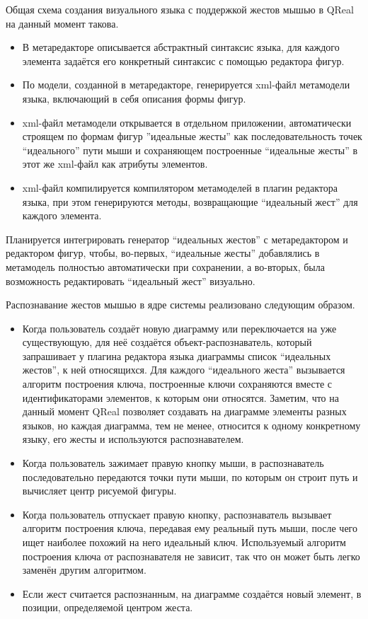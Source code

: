 \documentclass[a5paper]{article}
\begin{document}
Общая схема создания визуального языка с поддержкой жестов мышью в QReal на данный момент такова.
\begin{itemize}
  \item В метаредакторе описывается абстрактный синтаксис языка, для каждого элемента задаётся его конкретный синтаксис с помощью редактора фигур.
  \item По модели, созданной в метаредакторе, генерируется xml-файл метамодели языка, включающий в себя описания формы фигур.
  \item xml-файл метамодели открывается в отдельном приложении, автоматически строящем по формам фигур ''идеальные жесты'' как последовательность точек ``идеального'' пути мыши и сохраняющем построенные ``идеальные жесты'' в этот же xml-файл как атрибуты элементов.
  \item xml-файл компилируется компилятором метамоделей в плагин редактора языка, при этом генерируются методы, возвращающие ``идеальный жест'' для каждого элемента.
\end{itemize}
Планируется интегрировать генератор ``идеальных жестов'' с метаредактором и редактором фигур, чтобы, во-первых, ``идеальные жесты'' добавлялись в метамодель полностью автоматически при сохранении, а во-вторых, была возможность редактировать ``идеальный жест'' визуально.

Распознавание жестов мышью в ядре системы реализовано следующим образом.
\begin{itemize}
  \item Когда пользователь создаёт новую диаграмму или переключается на уже существующую, для неё создаётся объект-распознаватель, который запрашивает у плагина редактора языка диаграммы список ``идеальных жестов'', к ней относящихся. Для каждого ``идеального жеста'' вызывается алгоритм построения ключа, построенные ключи сохраняются вместе с идентификаторами элементов, к которым они относятся. Заметим, что на данный момент QReal позволяет создавать на диаграмме элементы разных языков, но каждая диаграмма, тем не менее, относится к одному конкретному языку, его жесты и используются распознавателем.
  \item Когда пользователь зажимает правую кнопку мыши, в распознаватель последовательно передаются точки пути мыши, по которым он строит путь и вычисляет центр рисуемой фигуры.
  \item Когда пользователь отпускает правую кнопку, распознаватель вызывает алгоритм построения ключа, передавая ему реальный путь мыши, после чего ищет наиболее похожий на него идеальный ключ. Используемый алгоритм построения ключа от распознавателя не зависит, так что он может быть легко заменён другим алгоритмом.
  \item Если жест считается распознанным, на диаграмме создаётся новый элемент, в позиции, определяемой центром жеста.
\end{itemize}
\end{document}
